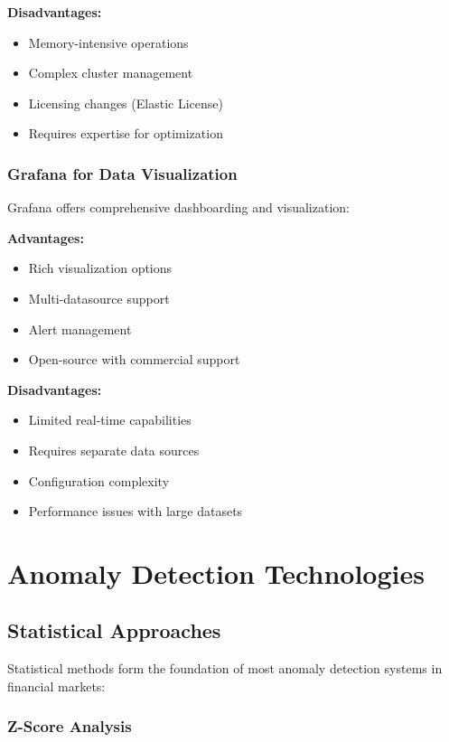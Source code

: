 \textbf{Disadvantages:}
\begin{itemize}
    \item Memory-intensive operations
    \item Complex cluster management
    \item Licensing changes (Elastic License)
    \item Requires expertise for optimization
\end{itemize}

\subsubsection{Grafana for Data Visualization}

Grafana offers comprehensive dashboarding and visualization:

\textbf{Advantages:}
\begin{itemize}
    \item Rich visualization options
    \item Multi-datasource support
    \item Alert management
    \item Open-source with commercial support
\end{itemize}

\textbf{Disadvantages:}
\begin{itemize}
    \item Limited real-time capabilities
    \item Requires separate data sources
    \item Configuration complexity
    \item Performance issues with large datasets
\end{itemize}

\section{Anomaly Detection Technologies}

\subsection{Statistical Approaches}

Statistical methods form the foundation of most anomaly detection systems in financial markets:

\subsubsection{Z-Score Analysis}

